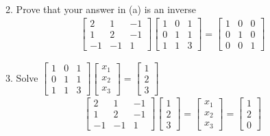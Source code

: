 \documentclass[12pt,a4paper]{paper}
\begin{document}
\begin{enumerate}
\begin{enumerate}
\begin{align*}
\end{align*}
\item Prove that your answer in (a) is an inverse
\begin{align*}
\left[\begin{array}{ccc}2&1&-1\\1&2&-1\\-1&-1&1\end{array}\right]\left[\begin{array}{ccc}1&0&1\\0&1&1\\1&1&3\end{array}\right] = \left[\begin{array}{ccc}1&0&0\\0&1&0\\0&0&1\end{array}\right]
\end{align*}
\item Solve $\left[\begin{array}{ccc}1&0&1\\0&1&1\\1&1&3\end{array}\right]\left[\begin{array}{c}x_1\\x_2\\x_3\end{array}\right]=\left[\begin{array}{c}1\\2\\3\end{array}\right]$
\begin{align*}
\left[\begin{array}{ccc}2&1&-1\\1&2&-1\\-1&-1&1\end{array}\right]\left[\begin{array}{c}1\\2\\3\end{array}\right] = \left[\begin{array}{c}x_{1}\\x_{2}\\x_{3}\end{array}\right] = \left[\begin{array}{c}1\\2\\0\end{array}\right]
\end{align*}

\end{enumerate}
\end{enumerate}
\end{document}
